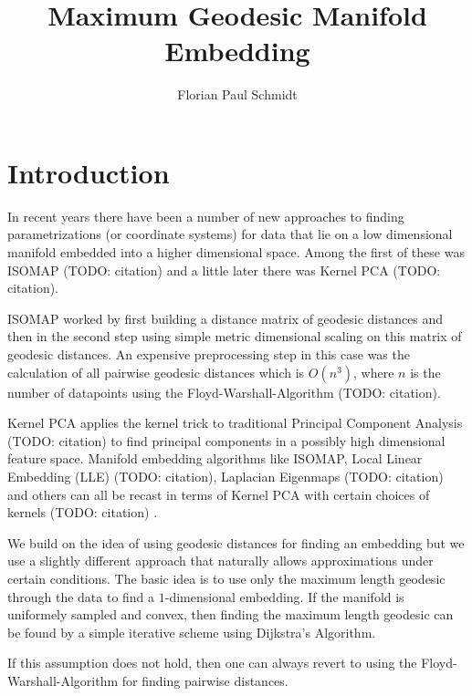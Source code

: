 \documentclass[11pt]{article}
\author{Florian Paul Schmidt}
\title{Maximum Geodesic Manifold Embedding}
\begin{document}
\maketitle


\section{Introduction}

In recent years there have been a number of new approaches to finding parametrizations (or coordinate systems) for data that lie on a low dimensional manifold embedded into a higher dimensional space. Among the first of these was ISOMAP (TODO: citation) and a little later there was Kernel PCA (TODO: citation).

ISOMAP worked by first building a distance matrix of geodesic distances and then in the second step using simple metric dimensional scaling on this matrix of geodesic distances. An expensive preprocessing step in this case was the calculation of all pairwise geodesic distances which is $O(n^3)$, where $n$ is the number of datapoints using the Floyd-Warshall-Algorithm (TODO: citation).

Kernel PCA applies the kernel trick to traditional Principal Component Analysis (TODO: citation) to find principal components in a possibly high dimensional feature space. Manifold embedding algorithms like ISOMAP, Local Linear Embedding (LLE) (TODO: citation), Laplacian Eigenmaps (TODO: citation) and others can all be recast in terms of Kernel PCA with certain choices of kernels (TODO: citation) .

We build on the idea of using geodesic distances for finding an embedding but we use a slightly different approach that naturally allows approximations under certain conditions. The basic idea is to use only the maximum length geodesic through the data to find a $1$-dimensional embedding. If the manifold is uniformely sampled and convex, then finding the maximum length geodesic can be found by a simple iterative scheme using Dijkstra's Algorithm. 

If this assumption does not hold, then one can always revert to using the Floyd-Warshall-Algorithm for finding pairwise distances.
\end{document}
